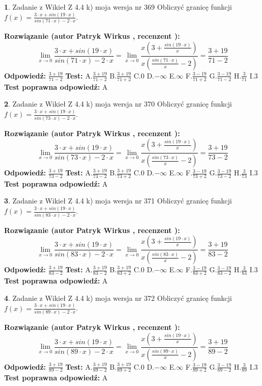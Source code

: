 \documentclass[12pt, a4paper]{article}
\theoremstyle{definition} %
\newtheorem{zad}{}
\newcommand{\zadStart}[1]{\begin{zad}#1\newline}
\newcommand{\zadStop}{\end{zad}}
\newcommand{\rozwStart}[2]{\noindent \textbf{Rozwiązanie (autor #1 , recenzent #2): }\newline}
\newcommand{\rozwStop}{\newline}
\newcommand{\odpStart}{\noindent \textbf{Odpowiedź:}\newline}
\newcommand{\odpStop}{\newline}
\newcommand{\testStart}{\noindent \textbf{Test:}\newline}
\newcommand{\testStop}{\newline}
\newcommand{\kluczStart}{\noindent \textbf{Test poprawna odpowiedź:}\newline}
\newcommand{\kluczStop}{\newline}
\begin{document}
\zadStart{Zadanie z Wikieł Z 4.4 k) moja wersja nr 369}
Obliczyć granicę funkcji $f(x)=\frac{3\cdot x +sin(19\cdot x)}{sin(71\cdot x) -2\cdot x}$.
\zadStop
\rozwStart{Patryk Wirkus}{}
$$\lim\limits_{x\to 0}\frac{3\cdot x +sin(19\cdot x)}{sin(71\cdot x) -2\cdot x}
=\lim\limits_{x\to 0}\frac{x(3+\frac{sin(19\cdot x)}{x})}{x(\frac{sin(71\cdot x)}{x}-2)}
=\frac{3+19}{71-2}$$
\rozwStop
\odpStart
$\frac{3+19}{71-2}$
\odpStop
\testStart
A.$\frac{3+19}{71-2}$
B.$\frac{3+19}{71+2}$
C.$0$
D.$-\infty$
E.$\infty$
F.$\frac{3-19}{71+2}$
G.$\frac{3-19}{71-2}$
H.$\frac{3}{71}$
I.$3$
\testStop
\kluczStart
A
\kluczStop



\zadStart{Zadanie z Wikieł Z 4.4 k) moja wersja nr 370}
Obliczyć granicę funkcji $f(x)=\frac{3\cdot x +sin(19\cdot x)}{sin(73\cdot x) -2\cdot x}$.
\zadStop
\rozwStart{Patryk Wirkus}{}
$$\lim\limits_{x\to 0}\frac{3\cdot x +sin(19\cdot x)}{sin(73\cdot x) -2\cdot x}
=\lim\limits_{x\to 0}\frac{x(3+\frac{sin(19\cdot x)}{x})}{x(\frac{sin(73\cdot x)}{x}-2)}
=\frac{3+19}{73-2}$$
\rozwStop
\odpStart
$\frac{3+19}{73-2}$
\odpStop
\testStart
A.$\frac{3+19}{73-2}$
B.$\frac{3+19}{73+2}$
C.$0$
D.$-\infty$
E.$\infty$
F.$\frac{3-19}{73+2}$
G.$\frac{3-19}{73-2}$
H.$\frac{3}{73}$
I.$3$
\testStop
\kluczStart
A
\kluczStop



\zadStart{Zadanie z Wikieł Z 4.4 k) moja wersja nr 371}
Obliczyć granicę funkcji $f(x)=\frac{3\cdot x +sin(19\cdot x)}{sin(83\cdot x) -2\cdot x}$.
\zadStop
\rozwStart{Patryk Wirkus}{}
$$\lim\limits_{x\to 0}\frac{3\cdot x +sin(19\cdot x)}{sin(83\cdot x) -2\cdot x}
=\lim\limits_{x\to 0}\frac{x(3+\frac{sin(19\cdot x)}{x})}{x(\frac{sin(83\cdot x)}{x}-2)}
=\frac{3+19}{83-2}$$
\rozwStop
\odpStart
$\frac{3+19}{83-2}$
\odpStop
\testStart
A.$\frac{3+19}{83-2}$
B.$\frac{3+19}{83+2}$
C.$0$
D.$-\infty$
E.$\infty$
F.$\frac{3-19}{83+2}$
G.$\frac{3-19}{83-2}$
H.$\frac{3}{83}$
I.$3$
\testStop
\kluczStart
A
\kluczStop



\zadStart{Zadanie z Wikieł Z 4.4 k) moja wersja nr 372}
Obliczyć granicę funkcji $f(x)=\frac{3\cdot x +sin(19\cdot x)}{sin(89\cdot x) -2\cdot x}$.
\zadStop
\rozwStart{Patryk Wirkus}{}
$$\lim\limits_{x\to 0}\frac{3\cdot x +sin(19\cdot x)}{sin(89\cdot x) -2\cdot x}
=\lim\limits_{x\to 0}\frac{x(3+\frac{sin(19\cdot x)}{x})}{x(\frac{sin(89\cdot x)}{x}-2)}
=\frac{3+19}{89-2}$$
\rozwStop
\odpStart
$\frac{3+19}{89-2}$
\odpStop
\testStart
A.$\frac{3+19}{89-2}$
B.$\frac{3+19}{89+2}$
C.$0$
D.$-\infty$
E.$\infty$
F.$\frac{3-19}{89+2}$
G.$\frac{3-19}{89-2}$
H.$\frac{3}{89}$
I.$3$
\testStop
\kluczStart
A
\kluczStop
\end{document}
